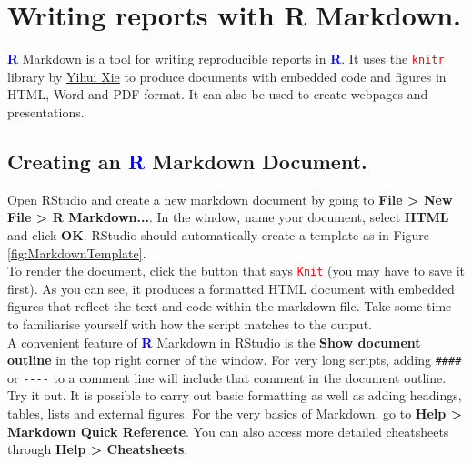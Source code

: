 \documentclass[a4paper,12pt]{article}
\newcommand\boldblue[1]{\textcolor{blue}{\textbf{#1}}}
\newcommand\code[1]{\textcolor{red}{\texttt{#1}}}
\begin{document}
\section {Writing reports with R Markdown.}

\boldblue{R} Markdown is a tool for writing reproducible reports in \boldblue{R}. It uses the \code{knitr} library by \href{https://yihui.name/knitr/}{Yihui Xie} to produce documents with embedded code and figures in HTML, Word and PDF format. It can also be used to create webpages and presentations. 

\subsection{Creating an \boldblue{R} Markdown Document.}

Open RStudio and create a new markdown document by going to \textbf{File > New File > R Markdown...}. In the window, name your document, select \textbf{HTML} and click \textbf{OK}. RStudio should automatically create a template as in Figure \ref{fig:MarkdownTemplate}. \\

To render the document, click the button that says \code{Knit} (you may have to save it first). As you can see, it produces a formatted HTML document with embedded figures that reflect the text and code within the markdown file. Take some time to familiarise yourself with how the script matches to the output. \\

A convenient feature of \boldblue{R} Markdown in RStudio is the \textbf{Show document outline} in the top right corner of the window. For very long scripts, adding \verb!####! or \verb!----! to a comment line will include that comment in the document outline. Try it out. It is possible to carry out basic formatting as well as adding headings, tables, lists and external figures. For the very basics of Markdown, go to \textbf{Help > Markdown Quick Reference}. You can also access more detailed cheatsheets through \textbf{Help > Cheatsheets}.\\
\end{document}
